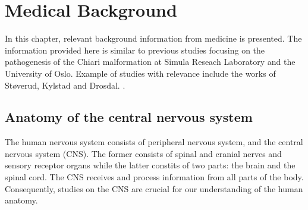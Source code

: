 \chapter{Medical Background}

In this chapter, relevant background information from medicine is presented. The information provided here is similar to previous studies focusing on the pathogenesis of the Chiari malformation at Simula Reseach Laboratory and the University of Oslo. Example of studies with relevance include the works of St{\o}verud, Kylstad and Drosdal. \cite{Stov14} \cite{Kyls14} \cite{Dros11}. 

\section{Anatomy of the central nervous system}
The human nervous system consists of peripheral nervous system, and the central nervous system (CNS). The former consists of spinal and cranial nerves and sensory receptor organs while the latter constits of two parts: the brain and the spinal cord. The CNS receives and process information from all parts of the body. Consequently, studies on the CNS are crucial for our understanding of the human anatomy.
